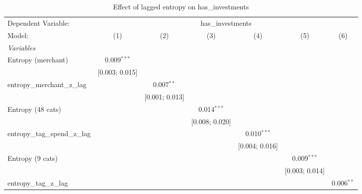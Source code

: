 
\begin{table}[htbp]
   \centering
   \tiny
   \begin{threeparttable}[b]
      \caption{\label{tab:reg_has_investments_lagged_z} Effect of lagged entropy on has\_investments}
      \begin{tabular}{lcccccc}
         \tabularnewline \midrule \midrule
         Dependent Variable: & \multicolumn{6}{c}{has\_investments}\\
         Model:                          & (1)             & (2)             & (3)             & (4)             & (5)             & (6)\\  
         \midrule
         \emph{Variables}\\
         Entropy (merchant)              & 0.009$^{***}$   &                 &                 &                 &                 &   \\   
                                         & [0.003; 0.015]  &                 &                 &                 &                 &   \\   
         entropy\_merchant\_z\_lag       &                 & 0.007$^{**}$    &                 &                 &                 &   \\   
                                         &                 & [0.001; 0.013]  &                 &                 &                 &   \\   
         Entropy (48 cats)               &                 &                 & 0.014$^{***}$   &                 &                 &   \\   
                                         &                 &                 & [0.008; 0.020]  &                 &                 &   \\   
         entropy\_tag\_spend\_z\_lag     &                 &                 &                 & 0.010$^{***}$   &                 &   \\   
                                         &                 &                 &                 & [0.004; 0.016]  &                 &   \\   
         Entropy (9 cats)                &                 &                 &                 &                 & 0.009$^{***}$   &   \\   
                                         &                 &                 &                 &                 & [0.003; 0.014]  &   \\   
         entropy\_tag\_z\_lag            &                 &                 &                 &                 &                 & 0.006$^{**}$\\   

\end{tabular}
\end{threeparttable}
\end{table}
